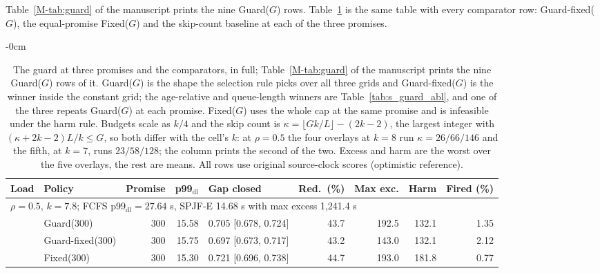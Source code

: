 \documentclass[mathematics,supfile,submit,moreauthors]{Definitions/mdpi}
\newcommand{\devnum}[1]{#1}
\begin{document}
Table~\ref*{M-tab:guard} of the manuscript prints the nine Guard($G$) rows.
Table~\ref{tab:s_guard} is the same table with every comparator row: Guard-fixed($G$),
the equal-promise Fixed($G$) and the skip-count baseline at each of the three promises.

\begin{table}[H]
\begin{adjustwidth}{-\extralength}{0cm}
\centering
\caption{The guard at three promises and the comparators, in full; Table~\ref*{M-tab:guard} of
the manuscript prints the nine Guard($G$) rows of it. Guard($G$)
is the shape the selection rule picks over all three grids and Guard-fixed($G$) is the winner
inside the constant grid; the age-relative and queue-length winners are
Table~\ref{tab:s_guard_abl}, and one of the three repeats Guard($G$) at each promise. Fixed($G$) uses the whole
cap at the same promise and
is infeasible under the harm rule. Budgets scale as $k/4$ and the skip count is
$\kappa = \lfloor Gk/L \rfloor - (2k-2)$, the largest integer with $(\kappa + 2k-2)L/k \le G$,
so both differ with the cell's $k$: at
$\rho = \devnum{0.5}$ the four overlays at $k = \devnum{8}$ run $\kappa = \devnum{26}/\devnum{66}/\devnum{146}$
and the fifth, at $k = \devnum{7}$, runs $\devnum{23}/\devnum{58}/\devnum{128}$; the column
prints the second of the two. Excess and harm are the worst over the five overlays, the
rest are means. All rows use original source-clock scores (optimistic reference).}
\label{tab:s_guard}
\small
\setlength{\tabcolsep}{3pt}
\begin{tabular}{llrrlrrrr}
\toprule
Load & Policy & Promise & p99$_{\mathrm{dl}}$ & Gap closed & Red.\ (\%) & Max exc. & Harm & Fired (\%) \\
\midrule
\multicolumn{9}{l}{$\rho = \devnum{0.5}$, $k = \devnum{7.8}$; FCFS p99$_{\mathrm{dl}} = \devnum{27.64}$ s, SPJF-E \devnum{14.68} s with max excess \devnum{1{,}241.4} s} \\
 & Guard($\devnum{300}$)      & \devnum{300} & \devnum{15.58} & \devnum{0.705 [0.678, 0.724]} & \devnum{43.7} & \devnum{192.5} & \devnum{132.1} & \devnum{1.35} \\
 & Guard-fixed($\devnum{300}$) & \devnum{300} & \devnum{15.75} & \devnum{0.697 [0.673, 0.717]} & \devnum{43.2} & \devnum{143.0} & \devnum{132.1} & \devnum{2.12} \\
 & Fixed($\devnum{300}$)      & \devnum{300} & \devnum{15.30} & \devnum{0.721 [0.696, 0.738]} & \devnum{44.7} & \devnum{193.0} & \devnum{181.8} & \devnum{0.77} \\

\end{tabular}
\end{adjustwidth}
\end{table}
\end{document}
